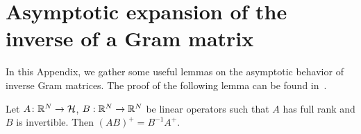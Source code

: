 
\section{Asymptotic expansion of the inverse of a Gram matrix}

In this Appendix, we gather some useful lemmas on the asymptotic behavior of inverse Gram matrices.
The proof of the following lemma can be found in~\cite{2016-duval-thinlasso}.
\begin{lem}
  Let $A\colon \mathbb{R}^N\rightarrow \mathcal{H}$, $B:\mathbb{R}^N\rightarrow\mathbb{R}^N$ be linear operators such that $A$ has full rank and $B$ is invertible. Then $(AB)^+=B^{-1}A^+$.
  \label{lem-apx-inverse}
\end{lem}

